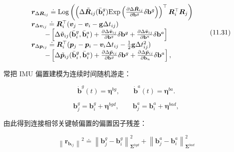 \begin{equation}
\begin{array}{r l} & {\pmb {r} _ {\Delta \pmb {R} _ {i j}} \doteq \mathrm{Log} \left(\left(\Delta \tilde {\pmb {R}} _ {i j} (\bar {\mathbf {b}} _ {i} ^ {g}) \mathrm{Exp} \left(\frac {\partial \Delta \bar {\pmb {R}} _ {i j}}{\partial \mathbf {b} ^ {g}} \delta \mathbf {b} ^ {g}\right)\right) ^ {\top} \pmb {R} _ {i} ^ {\top} \pmb {R} _ {j}\right)} \\ & {\pmb {r} _ {\Delta \pmb {v} _ {i j}} \doteq \pmb {R} _ {i} ^ {\top} (\pmb {v} _ {j} - \pmb {v} _ {i} - \mathbf {g} \Delta t _ {i j})} \\ & {\qquad - \left[ \Delta \tilde {\pmb {v}} _ {i j} (\bar {\mathbf {b}} _ {i} ^ {g}, \bar {\mathbf {b}} _ {i} ^ {a}) + \frac {\partial \Delta \bar {\pmb {v}} _ {i j}}{\partial \mathbf {b} ^ {g}} \delta \mathbf {b} ^ {g} + \frac {\partial \Delta \bar {\pmb {v}} _ {i j}}{\partial \mathbf {b} ^ {a}} \delta \mathbf {b} ^ {a} \right]} \\ & {\pmb {r} _ {\Delta \pmb {p} _ {i j}} \doteq \pmb {R} _ {i} ^ {\top} (\pmb {p} _ {j} - \pmb {p} _ {i} - \pmb {v} _ {i} \Delta t _ {i j} - \frac 12 \mathbf {g} \Delta t _ {i j} ^ {2})} \\ & {\qquad - \left[ \Delta \tilde {\pmb {p}} _ {i j} (\bar {\mathbf {b}} _ {i} ^ {g}, \bar {\mathbf {b}} _ {i} ^ {a}) + \frac {\partial \Delta \bar {\pmb {p}} _ {i j}}{\partial \mathbf {b} ^ {g}} \delta \mathbf {b} ^ {g} + \frac {\partial \Delta \bar {\pmb {p}} _ {i j}}{\partial \mathbf {b} _ {a}} \delta \mathbf {b} ^ {a} \right],} \end{array}\tag{11.31}
\end{equation}

常把 IMU 偏置建模为连续时间随机游走：

\begin{equation}
\dot {\mathbf {b}} ^ {g} (t) = \pmb {\eta} ^ {b g}, \qquad \dot {\mathbf {b}} ^ {a} (t) = \pmb {\eta} ^ {b a}.\tag{11.32}
\end{equation}

\begin{equation}
\mathbf {b} _ {j} ^ {g} = \mathbf {b} _ {i} ^ {g} + \boldsymbol {\eta} ^ {b g d}, \qquad \mathbf {b} _ {j} ^ {a} = \mathbf {b} _ {i} ^ {a} + \boldsymbol {\eta} ^ {b a d},\tag{11.33}
\end{equation}

由此得到连接相邻关键帧偏置的偏置因子残差：

\begin{equation}
\left\| \boldsymbol {r} _ {\mathbf {b} _ {i j}} \right\| ^ {2} \doteq \left\| \mathbf {b} _ {j} ^ {g} - \mathbf {b} _ {i} ^ {g} \right\| _ {\boldsymbol {\Sigma} ^ {b g d}} ^ {2} + \left\| \mathbf {b} _ {j} ^ {a} - \mathbf {b} _ {i} ^ {a} \right\| _ {\boldsymbol {\Sigma} ^ {b a d}} ^ {2}\tag{11.34}
\end{equation}

